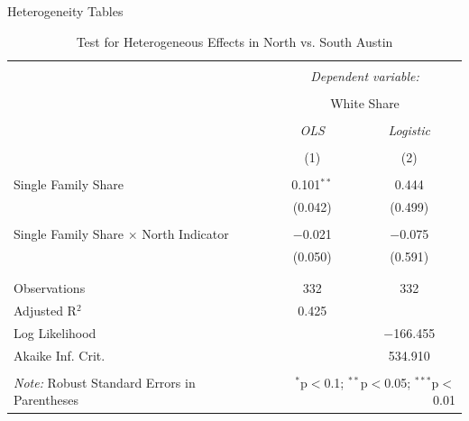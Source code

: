 \documentclass{beamer}
\begin{document}
\begin{frame}{Heterogeneity Tables}
    \tiny
\begin{table}[H] \centering 
  \caption{Test for Heterogeneous Effects in North vs. South Austin} 
  \label{tab:river_heteroeneity} 
\begin{tabular}{@{\extracolsep{5pt}}lcc} 
\\[-1.8ex]\hline 
\hline \\[-1.8ex] 
 & \multicolumn{2}{c}{\textit{Dependent variable:}} \\ 
\cline{2-3} 
\\[-1.8ex] & \multicolumn{2}{c}{White Share} \\ 
\\[-1.8ex] & \textit{OLS} & \textit{Logistic} \\ 
\\[-1.8ex] & (1) & (2)\\ 
\hline \\[-1.8ex] 
 Single Family Share & 0.101$^{**}$ & 0.444 \\ 
  & (0.042) & (0.499) \\ 
  & & \\ 
 Single Family Share $\times$ North Indicator & $-$0.021 & $-$0.075 \\ 
  & (0.050) & (0.591) \\ 
  & & \\ 
\hline \\[-1.8ex] 
Observations & 332 & 332 \\ 
Adjusted R$^{2}$ & 0.425 &  \\ 
Log Likelihood &  & $-$166.455 \\ 
Akaike Inf. Crit. &  & 534.910 \\ 
\hline 
\hline \\[-1.8ex] 
\textit{Note:} Robust Standard Errors in Parentheses  & \multicolumn{2}{r}{$^{*}$p$<$0.1; $^{**}$p$<$0.05; $^{***}$p$<$0.01} \\ 
\end{tabular} 
\end{table}
\end{frame}
\end{document}
